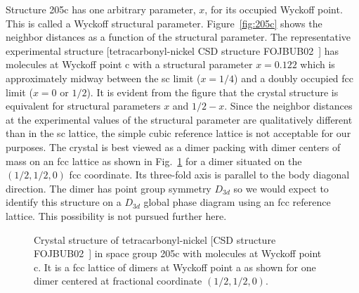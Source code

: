 \documentclass[preprint]{iucr}              %
\begin{document}
Structure 205c has one arbitrary parameter, $x$, for its occupied
Wyckoff point.  This is called a Wyckoff structural parameter.
Figure~\ref{fig:205c} shows the neighbor distances as a function of
the structural parameter. The representative experimental structure
[tetracarbonyl-nickel CSD structure FOJBUB02~\cite{Braga93}] has
molecules at Wyckoff point c with a structural parameter $x=0.122$
which is approximately midway between the sc limit ($x=1/4$) and a
doubly occupied fcc limit ($x=0$ or $1/2$). It is evident from the
figure that the crystal structure is equivalent for structural
parameters $x$ and $1/2-x$. Since the neighbor distances at the
experimental values of the structural parameter are qualitatively
different than in the sc lattice, the simple cubic reference lattice
is not acceptable for our purposes. The crystal is best viewed as a
dimer packing with dimer centers of mass on an fcc lattice as shown
in Fig.~\ref{dimers} for a dimer situated on the $(1/2,1/2,0)$ fcc
coordinate. Its three-fold axis is parallel to the body diagonal
direction. The dimer has point group symmetry $D_{3d}$ so we would
expect to identify this structure on a $D_{3d}$ global phase diagram
using an fcc reference lattice. This possibility is not pursued
further here.

\begin{figure}
\begin{center}
\caption[Crystal structure of tetracarbonyl-nickel in space group
205c]{Crystal structure of tetracarbonyl-nickel [CSD structure
FOJBUB02~\cite{Braga93}] in space group 205c with molecules at
Wyckoff point c. It is a fcc lattice of dimers at Wyckoff point a as
shown for one dimer centered at fractional coordinate
$(1/2,1/2,0)$.\label{dimers}}
\end{center}
\end{figure}
\end{document}
